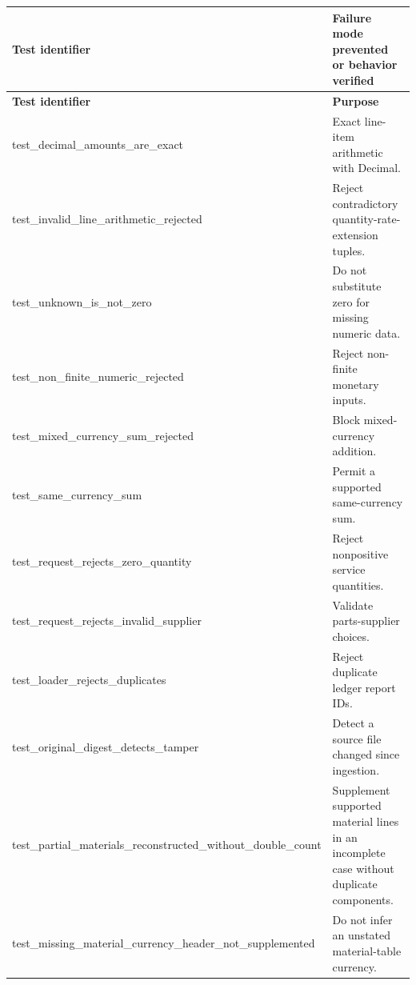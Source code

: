 \documentclass[11pt,a4paper]{article}
\begin{document}
\begin{longtable}{@{}L{76mm}L{70mm}@{}}
\toprule
\textbf{Test identifier} & \textbf{Failure mode prevented or behavior verified}\\
\midrule\endfirsthead
\toprule\textbf{Test identifier} & \textbf{Purpose}\\
\midrule\endhead
{\footnotesize\ttfamily test\_\allowbreak decimal\_\allowbreak amounts\_\allowbreak are\_\allowbreak exact} & Exact line-item arithmetic with Decimal.\\
{\footnotesize\ttfamily test\_\allowbreak invalid\_\allowbreak line\_\allowbreak arithmetic\_\allowbreak rejected} & Reject contradictory quantity-rate-extension tuples.\\
{\footnotesize\ttfamily test\_\allowbreak unknown\_\allowbreak is\_\allowbreak not\_\allowbreak zero} & Do not substitute zero for missing numeric data.\\
{\footnotesize\ttfamily test\_\allowbreak non\_\allowbreak finite\_\allowbreak numeric\_\allowbreak rejected} & Reject non-finite monetary inputs.\\
{\footnotesize\ttfamily test\_\allowbreak mixed\_\allowbreak currency\_\allowbreak sum\_\allowbreak rejected} & Block mixed-currency addition.\\
{\footnotesize\ttfamily test\_\allowbreak same\_\allowbreak currency\_\allowbreak sum} & Permit a supported same-currency sum.\\
{\footnotesize\ttfamily test\_\allowbreak request\_\allowbreak rejects\_\allowbreak zero\_\allowbreak quantity} & Reject nonpositive service quantities.\\
{\footnotesize\ttfamily test\_\allowbreak request\_\allowbreak rejects\_\allowbreak invalid\_\allowbreak supplier} & Validate parts-supplier choices.\\
{\footnotesize\ttfamily test\_\allowbreak loader\_\allowbreak rejects\_\allowbreak duplicates} & Reject duplicate ledger report IDs.\\
{\footnotesize\ttfamily test\_\allowbreak original\_\allowbreak digest\_\allowbreak detects\_\allowbreak tamper} & Detect a source file changed since ingestion.\\
{\footnotesize\ttfamily test\_\allowbreak partial\_\allowbreak materials\_\allowbreak reconstructed\_\allowbreak without\_\allowbreak double\_\allowbreak count} & Supplement supported material lines in an incomplete case without duplicate components.\\
{\footnotesize\ttfamily test\_\allowbreak missing\_\allowbreak material\_\allowbreak currency\_\allowbreak header\_\allowbreak not\_\allowbreak supplemented} & Do not infer an unstated material-table currency.\\

\end{longtable}
\end{document}
